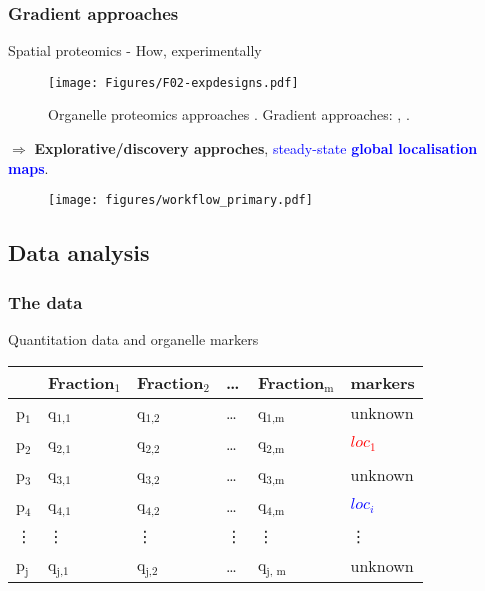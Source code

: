 \subsubsection*{Gradient approaches}
\label{sec:grad}

\begin{frame}{Spatial proteomics - How, experimentally}
  \begin{figure}
    \texttt{[image: Figures/F02-expdesigns.pdf]}
    \caption{Organelle proteomics approaches
      \citep{Gatto:2010}. Gradient approaches: \cite{Dunkley:2006},
      \cite{Foster2006}.}
  \end{figure}
  $\Rightarrow$ \textbf{Explorative/discovery approches},
  \textcolor{Blue}{steady-state \textbf{global localisation maps}}.
\end{frame}


\begin{frame}{}
  \begin{figure}
    \texttt{[image: figures/workflow\_primary.pdf]}
  \end{figure} 
\end{frame}

\subsection*{Data analysis}
\label{sec:comp}

\subsubsection*{The data}
\label{sec:data}
 
\begin{frame}{Quantitation data and organelle markers}
  \begin{center}
    \begin{tabular}{|l|llll||l|}
      \hline
      & Fraction$_{\text{1}}$ & Fraction$_{\text{2}}$ & \ldots{} & Fraction$_{\text{m}}$ & markers\\
      \hline
      p$_{\text{1}}$ & q$_{\text{1,1}}$ & q$_{\text{1,2}}$ & \ldots{} & q$_{\text{1,m}}$ & unknown \\
      p$_{\text{2}}$ & q$_{\text{2,1}}$ & q$_{\text{2,2}}$ & \ldots{} & q$_{\text{2,m}}$ & \textcolor{Red}{$loc_{1}$}\\
      p$_{\text{3}}$ & q$_{\text{3,1}}$ & q$_{\text{3,2}}$ & \ldots{} & q$_{\text{3,m}}$ & unknown \\
      p$_{\text{4}}$ & q$_{\text{4,1}}$ & q$_{\text{4,2}}$ & \ldots{} & q$_{\text{4,m}}$ & \textcolor{Blue}{$loc_{i}$}\\
      \vdots & \vdots & \vdots & \vdots & \vdots & \vdots\\
      p$_{\text{j}}$ & q$_{\text{j,1}}$ & q$_{\text{j,2}}$ & \ldots{} & q$_{\text{j, m}}$ & unknown \\
      \hline
    \end{tabular}
  \end{center}
\end{frame}

